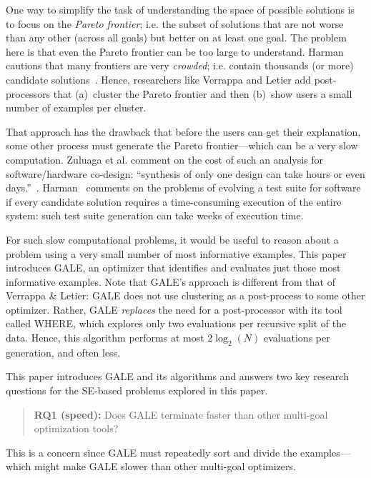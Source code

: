 \documentclass[10pt,journal,compsoc]{IEEEtran}
\newcommand{\fig}[1]{Figure~\ref{fig:#1}}
\begin{document}

One way to simplify the task of understanding the space of possible solutions is to focus on the {\em Pareto frontier}; i.e. the subset of solutions that are not worse than any other (across all goals) but better on at least one goal. 
The problem here is that even the Pareto frontier can be too large to understand.
Harman cautions that many frontiers are very {\em crowded}; i.e. contain thousands (or more)  candidate solutions~\cite{harm13}.
Hence, researchers like Verrappa and Letier add post-processors that (a)~cluster the Pareto frontier and then (b)~show users a small number of examples per cluster. 

That approach has the drawback that before the users can get their explanation, some other process must generate the Pareto frontier---which can be a very slow computation.  
Zuluaga et al. comment on the cost of such an analysis for software/hardware co-design: ``synthesis of only one design can take hours or even days.''~\cite{Zuluaga:13}.  
Harman~\cite{harm13} comments on the problems of evolving a test suite for software if every candidate solution requires a time-consuming execution of the entire system: such test suite generation can take weeks of execution time. 

For such slow computational problems, it would be useful to reason about a problem using a very small number of most informative examples. 
This paper introduces GALE, an optimizer that  identifies and evaluates just those most informative examples.
Note that GALE's approach is different from that of Verrappa \& Letier: GALE does not use clustering as a post-process to some other optimizer.
Rather, GALE {\em replaces} the need for a post-processor with its tool called WHERE, which explores only two evaluations per recursive split of the data. 
Hence, this algorithm performs at most $2{\log_2}(N)$ evaluations per generation, and often less. 

This paper introduces GALE and its algorithms and answers two key research questions for the SE-based problems explored in this paper.
\begin{quote}
{\bf RQ1 (speed):} Does GALE terminate faster than other multi-goal optimization tools?
\end{quote}
This is a concern since GALE must  repeatedly sort and divide  the examples---which might  make  GALE  slower than other multi-goal optimizers.
\end{document}
